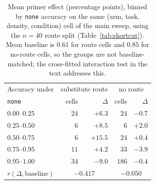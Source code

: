 \documentclass[11pt]{article}
\begin{document}
\begin{table}[H]
\centering
\footnotesize
\setlength{\tabcolsep}{3pt}
\caption{\texttt{edge\_existence}, main sweep: change in sensitivity $d'$
and criterion $c$ against \texttt{none}, averaged over the four densities
(log-linear correction; $95\%$ bootstrap CI for $\Delta d'$). With the hit
rate at ceiling, $d'$ and $c$ are not separately identifiable.}
\label{tab:sdt}
\end{table}

\begin{table}[H]
\centering
\small
\setlength{\tabcolsep}{4pt}
\begin{tabular}{lrrrr}
\toprule
Accuracy under & \multicolumn{2}{c}{substitute route} & \multicolumn{2}{c}{no route} \\
\cmidrule(lr){2-3}\cmidrule(lr){4-5}
\texttt{none} & cells & $\Delta$ & cells & $\Delta$ \\
\midrule
$0.00$--$0.25$ & $24$ & $+6.3$  & $24$  & $-0.7$ \\
$0.25$--$0.50$ & $6$  & $+8.5$  & $6$   & $+2.0$ \\
$0.50$--$0.75$ & $6$  & $+15.5$ & $24$  & $+0.4$ \\
$0.75$--$0.95$ & $11$ & $+4.2$  & $33$  & $-3.9$ \\
$0.95$--$1.00$ & $34$ & $-9.0$  & $186$ & $-0.4$ \\
\midrule
$r(\Delta,\mathrm{baseline})$ & \multicolumn{2}{c}{$-0.417$} & \multicolumn{2}{c}{$-0.050$} \\
\bottomrule
\end{tabular}
\caption{Mean primer effect (percentage points), binned by \texttt{none}
accuracy on the same (arm, task, density, condition) cell of the main
sweep, using the $n{=}40$ route split (Table~\ref{tab:shortcut}).
Mean baseline is $0.61$ for route cells and $0.85$ for no-route cells, so
the groups are not baseline-matched; the cross-fitted interaction test in
the text addresses this.}
\label{tab:baseline}
\end{table}
\end{document}
